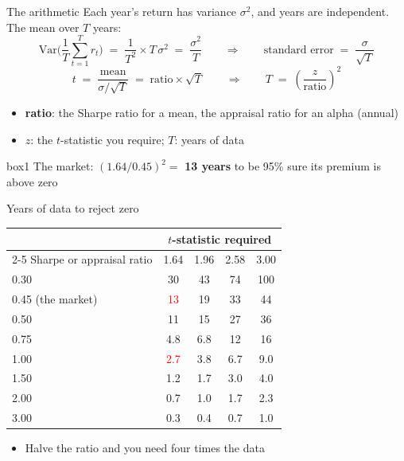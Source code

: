 \documentclass[aspectratio=169,10pt]{beamer}
\begin{document}
\begin{frame}{The arithmetic}
Each year's return has variance $\sigma^2$, and years are independent. The mean over $T$ years:
\[ \text{Var}\Big(\frac{1}{T}\sum_{t=1}^{T} r_t\Big) \;=\; \frac{1}{T^2} \times T\,\sigma^2 \;=\; \frac{\sigma^2}{T}
   \qquad\Longrightarrow\qquad \text{standard error} \;=\; \frac{\sigma}{\sqrt{T}} \]
\vskip 2pt
\[ t \;=\; \frac{\text{mean}}{\sigma/\sqrt{T}} \;=\; \text{ratio} \times \sqrt{T}
   \qquad\Longrightarrow\qquad T \;=\; \left(\frac{z}{\text{ratio}}\right)^{2} \]
\vskip 2pt
\begin{itemize}
\item \textbf{ratio}: the Sharpe ratio for a mean, the appraisal ratio for an alpha (annual)
\vskip 4pt
\item $z$: the $t$-statistic you require; $T$: years of data
\end{itemize}
\vskip 8pt
\begin{beamercolorbox}[rounded=true,sep=8pt,center]{box1}
The market: $(1.64 / 0.45)^2 = $ \textbf{13 years} to be 95\% sure its premium is above zero
\end{beamercolorbox}
\end{frame}

\begin{frame}{Years of data to reject zero}
\begin{center}
\renewcommand{\arraystretch}{1.25}
\begin{tabular}{lcccc}
\toprule
 & \multicolumn{4}{c}{$t$-statistic required} \\
\cmidrule(lr){2-5}
Sharpe or appraisal ratio & 1.64 & 1.96 & 2.58 & 3.00 \\
\midrule
0.30 & 30 & 43 & 74 & 100 \\
0.45 \;(the market) & \textcolor{red}{13} & 19 & 33 & 44 \\
0.50 & 11 & 15 & 27 & 36 \\
0.75 & 4.8 & 6.8 & 12 & 16 \\
1.00 & \textcolor{red}{2.7} & 3.8 & 6.7 & 9.0 \\
1.50 & 1.2 & 1.7 & 3.0 & 4.0 \\
2.00 & 0.7 & 1.0 & 1.7 & 2.3 \\
3.00 & 0.3 & 0.4 & 0.7 & 1.0 \\
\bottomrule
\end{tabular}
\end{center}
\vskip 4pt
\begin{itemize}
\item Halve the ratio and you need four times the data
\end{itemize}
\end{frame}
\end{document}
